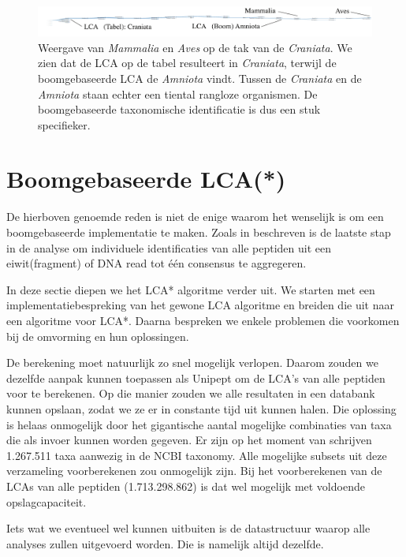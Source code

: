 \begin{figure}
    \centering
    \includegraphics[width=1\textwidth]{includes/tabelanalyse}
    \caption{Weergave van \textit{Mammalia} en \textit{Aves} op de tak van de
    \textit{Craniata}. We zien dat de LCA op de tabel resulteert in
    \textit{Craniata}, terwijl de boomgebaseerde LCA de \textit{Amniota} vindt.
    Tussen de \textit{Craniata} en de \textit{Amniota} staan echter een tiental
    rangloze organismen. De boomgebaseerde taxonomische identificatie is dus een
    stuk specifieker.}
    \label{fig:boomvoorbeeld}
\end{figure}

\section{Boomgebaseerde LCA(*)} De hierboven genoemde reden is niet de enige
waarom het wenselijk is om een boomgebaseerde implementatie te maken. Zoals in
 beschreven is de laatste stap in de analyse om individuele
identificaties van alle peptiden uit een eiwit(fragment) of DNA read tot één
consensus te aggregeren.

In deze sectie diepen we het LCA* algoritme verder uit. We starten met een
implementatiebespreking van het gewone LCA algoritme en breiden die uit naar een
algoritme voor LCA*. Daarna bespreken we enkele problemen die voorkomen bij de
omvorming en hun oplossingen.

De berekening moet natuurlijk zo snel mogelijk verlopen. Daarom zouden we
dezelfde aanpak kunnen toepassen als Unipept om de LCA's van alle peptiden voor
te berekenen. Op die manier zouden we alle resultaten in een databank kunnen
opslaan, zodat we ze er in constante tijd uit kunnen halen. Die oplossing is
helaas onmogelijk door het gigantische aantal mogelijke combinaties van taxa die
als invoer kunnen worden gegeven. Er zijn op het moment van schrijven 1.267.511
taxa aanwezig in de NCBI taxonomy. Alle mogelijke subsets uit deze verzameling
voorberekenen zou onmogelijk zijn. Bij het voorberekenen van de LCAs van alle
peptiden (1.713.298.862) is dat wel mogelijk met voldoende opslagcapaciteit.

Iets wat we eventueel wel kunnen uitbuiten is de datastructuur waarop alle
analyses zullen uitgevoerd worden. Die is namelijk altijd dezelfde.

